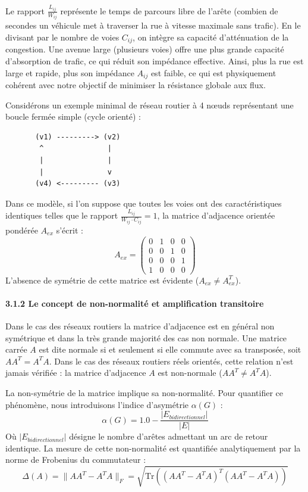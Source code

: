 \documentclass[10pt, a4paper]{article}
\begin{document}
Le rapport \(\frac{L_{ij}}{W_{ij}}\) représente le temps de parcours
libre de l'arête (combien de secondes un véhicule met à traverser la rue
à vitesse maximale sans trafic). En le divisant par le nombre de voies
\(C_{ij}\), on intègre sa capacité d'atténuation de la congestion. Une
avenue large (plusieurs voies) offre une plus grande capacité
d'absorption de trafic, ce qui réduit son impédance effective. Ainsi,
plus la rue est large et rapide, plus son impédance \(A_{ij}\) est
faible, ce qui est physiquement cohérent avec notre objectif de
minimiser la résistance globale aux flux.

Considérons un exemple minimal de réseau routier à 4 nœuds représentant
une boucle fermée simple (cycle orienté) :

\begin{verbatim}
       (v1) ---------> (v2)
        ^               |
        |               |
        |               v
       (v4) <--------- (v3)
\end{verbatim}

Dans ce modèle, si l'on suppose que toutes les voies ont des
caractéristiques identiques telles que le rapport
\(\frac{L_{ij}}{W_{ij} \cdot C_{ij}} = 1\), la matrice d'adjacence
orientée pondérée \(A_{ex}\) s'écrit : \[A_{ex} = \begin{pmatrix}
0 & 1 & 0 & 0 \\
0 & 0 & 1 & 0 \\
0 & 0 & 0 & 1 \\
1 & 0 & 0 & 0
\end{pmatrix}\] L'absence de symétrie de cette matrice est évidente
(\(A_{ex} \neq A_{ex}^T\)).

\paragraph{3.1.2 Le concept de non-normalité et amplification
transitoire}\label{le-concept-de-non-normalituxe9-et-amplification-transitoire}

Dans le cas des réseaux routiers la matrice d'adjacence est en général
non symétrique et dans la très grande majorité des cas non normale. Une
matrice carrée \(A\) est dite normale si et seulement si elle commute
avec sa transposée, soit \(A A^T = A^T A\). Dans le cas des réseaux
routiers réels orientés, cette relation n'est jamais vérifiée : la
matrice d'adjacence \(A\) est non-normale (\(A A^T \neq A^T A\)).

La non-symétrie de la matrice implique sa non-normalité. Pour quantifier
ce phénomène, nous introduisons l'indice d'asymétrie \(\alpha(G)\) :
\[\alpha(G) = 1.0 - \frac{|E_{bidirectionnel}|}{|E|}\] Où
\(|E_{bidirectionnel}|\) désigne le nombre d'arêtes admettant un arc de
retour identique. La mesure de cette non-normalité est quantifiée
analytiquement par la norme de Frobenius du commutateur :
\[\Delta(A) = \| A A^T - A^T A \|_F = \sqrt{\text{Tr}\left( (A A^T - A^T A)^T (A A^T - A^T A) \right)}\]
\end{document}
